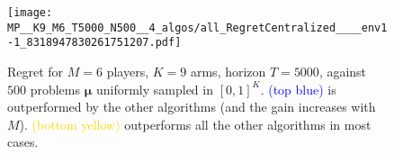 %
%
\begin{figure}[!t]
    \texttt{[image: MP\_\_K9\_M6\_T5000\_N500\_\_4\_algos/all\_RegretCentralized\_\_\_\_env1-1\_8318947830261751207.pdf]}
  \caption[Regret for $M=6$ players, $K=9$ arms, horizon $T=5000$, against $500$ problems $\boldsymbol{\mu}$ uniformly sampled.]{Regret for $M=6$ players, $K=9$ arms, horizon $T=5000$, against $500$ problems $\boldsymbol{\mu}$ uniformly sampled in $[0,1]^K$. \textcolor{blue}{\rhoRand{} (top blue)} is outperformed by the other algorithms (and the gain increases with $M$). \textcolor{gold}{\MCTopM{} (bottom yellow)} outperforms all the other algorithms in most cases.}
  \label{fig:5:MP__K9_M6_T5000_N500__4_algos__all_RegretCentralized__BayesianProblems}
\end{figure}


%
%

